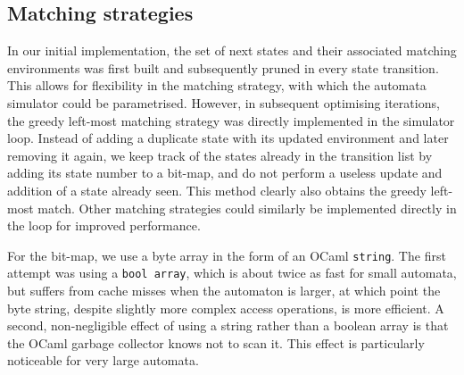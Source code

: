 \subsection{Matching strategies}

In our initial implementation, the set of next states and their associated
matching environments was first built and subsequently pruned in every state
transition. This allows for flexibility in the matching strategy, with which the
automata simulator could be parametrised. However, in subsequent optimising
iterations, the greedy left-most matching strategy was directly implemented in
the simulator loop. Instead of adding a duplicate state with its updated
environment and later removing it again, we keep track of the states already in
the transition list by adding its state number to a bit-map, and do not perform
a useless update and addition of a state already seen. This method clearly also
obtains the greedy left-most match. Other matching strategies could similarly be
implemented directly in the loop for improved performance.

For the bit-map, we use a byte array in the form of an OCaml \texttt{string}.
The first attempt was using a \texttt{bool array}, which is about twice as fast
for small automata, but suffers from cache misses when the automaton is larger,
at which point the byte string, despite slightly more complex access operations,
is more efficient. A second, non-negligible effect of using a string rather than
a boolean array is that the OCaml garbage collector knows not to scan it. This
effect is particularly noticeable for very large automata.


